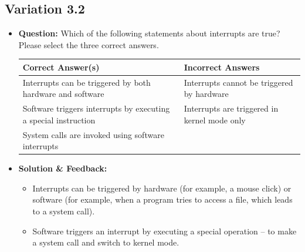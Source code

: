 \subsection{Variation 3.2}
\begin{itemize}
    \item \textbf{Question:} Which of the following statements about interrupts are true? Please select the three correct answers.
    
    \begin{tabularx}{\textwidth}{|X|X|}
        \hline
        \textbf{Correct Answer(s)} & \textbf{Incorrect Answers} \\
        \hline
        Interrupts can be triggered by both hardware and software & Interrupts cannot be triggered by hardware \\
        Software triggers interrupts by executing a special instruction & Interrupts are triggered in kernel mode only \\
        System calls are invoked using software interrupts & \\
        \hline
    \end{tabularx}
    
    \item \textbf{Solution \& Feedback:}
    \begin{itemize}
        \item Interrupts can be triggered by hardware (for example, a mouse click) or software (for example, when a program tries to access a file, which leads to a system call).
        \item Software triggers an interrupt by executing a special operation – to make a system call and switch to kernel mode.
    \end{itemize}
\end{itemize}

